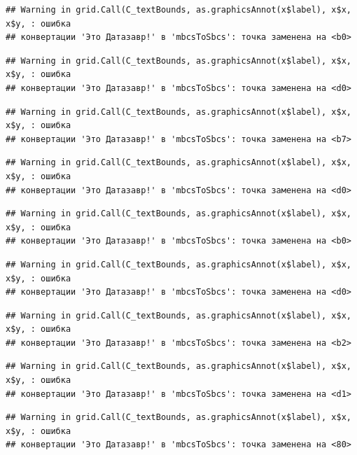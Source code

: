 \documentclass[]{book}
\begin{document}
\begin{verbatim}
## Warning in grid.Call(C_textBounds, as.graphicsAnnot(x$label), x$x, x$y, : ошибка
## конвертации 'Это Датазавр!' в 'mbcsToSbcs': точка заменена на <b0>
\end{verbatim}

\begin{verbatim}
## Warning in grid.Call(C_textBounds, as.graphicsAnnot(x$label), x$x, x$y, : ошибка
## конвертации 'Это Датазавр!' в 'mbcsToSbcs': точка заменена на <d0>
\end{verbatim}

\begin{verbatim}
## Warning in grid.Call(C_textBounds, as.graphicsAnnot(x$label), x$x, x$y, : ошибка
## конвертации 'Это Датазавр!' в 'mbcsToSbcs': точка заменена на <b7>
\end{verbatim}

\begin{verbatim}
## Warning in grid.Call(C_textBounds, as.graphicsAnnot(x$label), x$x, x$y, : ошибка
## конвертации 'Это Датазавр!' в 'mbcsToSbcs': точка заменена на <d0>
\end{verbatim}

\begin{verbatim}
## Warning in grid.Call(C_textBounds, as.graphicsAnnot(x$label), x$x, x$y, : ошибка
## конвертации 'Это Датазавр!' в 'mbcsToSbcs': точка заменена на <b0>
\end{verbatim}

\begin{verbatim}
## Warning in grid.Call(C_textBounds, as.graphicsAnnot(x$label), x$x, x$y, : ошибка
## конвертации 'Это Датазавр!' в 'mbcsToSbcs': точка заменена на <d0>
\end{verbatim}

\begin{verbatim}
## Warning in grid.Call(C_textBounds, as.graphicsAnnot(x$label), x$x, x$y, : ошибка
## конвертации 'Это Датазавр!' в 'mbcsToSbcs': точка заменена на <b2>
\end{verbatim}

\begin{verbatim}
## Warning in grid.Call(C_textBounds, as.graphicsAnnot(x$label), x$x, x$y, : ошибка
## конвертации 'Это Датазавр!' в 'mbcsToSbcs': точка заменена на <d1>
\end{verbatim}

\begin{verbatim}
## Warning in grid.Call(C_textBounds, as.graphicsAnnot(x$label), x$x, x$y, : ошибка
## конвертации 'Это Датазавр!' в 'mbcsToSbcs': точка заменена на <80>
\end{verbatim}
\end{document}
